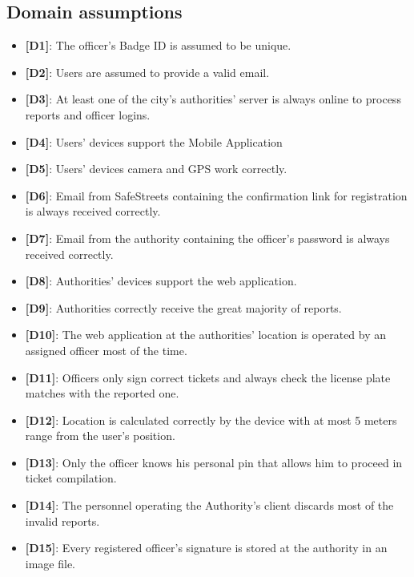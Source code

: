 \documentclass[12pt,a4paper]{article}
\begin{document}
\subsection{Domain assumptions} 
\begin{itemize}
\item {\textbf[}\textbf{D1}{\textbf]}: The officer's Badge ID is assumed to be unique.
\item {\textbf[}\textbf{D2}{\textbf]}: Users are assumed to provide a valid email.
\item {\textbf[}\textbf{D3}{\textbf]}: At least one of the city's authorities' server is always online to process reports and officer logins.
\item {\textbf[}\textbf{D4}{\textbf]}: Users' devices support the Mobile Application 
\item {\textbf[}\textbf{D5}{\textbf]}: Users' devices camera and GPS work correctly.
\item {\textbf[}\textbf{D6}{\textbf]}: Email from SafeStreets containing the confirmation link for registration is always received correctly.
\item {\textbf[}\textbf{D7}{\textbf]}: Email from the authority containing the officer's password is always received correctly.
\item {\textbf[}\textbf{D8}{\textbf]}: Authorities' devices support the web application.
\item {\textbf[}\textbf{D9}{\textbf]}: Authorities correctly receive the great majority of reports.
\item {\textbf[}\textbf{D10}{\textbf]}: The web application at the authorities' location is operated by an assigned officer most of the time.
\item {\textbf[}\textbf{D11}{\textbf]}: Officers only sign correct tickets and always check the license plate matches with the reported one.
\item {\textbf[}\textbf{D12}{\textbf]}: Location is calculated correctly by the device with at most 5 meters range from the user's position.
\item {\textbf[}\textbf{D13}{\textbf]}: Only the officer knows his personal pin that allows him to proceed in ticket compilation.
\item {\textbf[}\textbf{D14}{\textbf]}: The personnel operating the Authority's client discards most of the invalid reports.
\item {\textbf[}\textbf{D15}{\textbf]}: Every registered officer's signature is stored at the authority in an image file.
\end{itemize}
\end{document}
